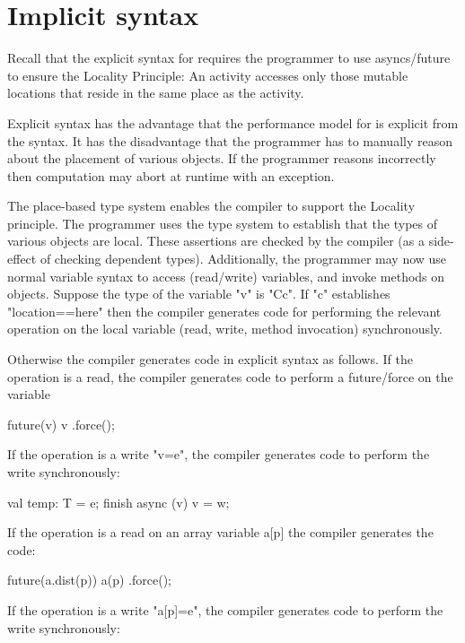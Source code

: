 \section{Implicit syntax}\label{ImplicitSyntax}

Recall that the explicit syntax for \Xten{} requires the programmer to use
asyncs/future to ensure the Locality Principle: An activity accesses
only those mutable locations that reside in the same place as the
activity. 

Explicit syntax has the advantage that the performance model for \Xten{}
is explicit from the syntax. It has the disadvantage that the
programmer has to manually reason about the placement of various
objects. If the programmer reasons incorrectly then computation may
abort at runtime with an exception.

The place-based type system enables the compiler to support the
Locality principle. The programmer uses the type system to establish
that the types of various objects are local. These assertions are
checked by the compiler (as a side-effect of checking dependent
types). Additionally, the programmer may now use normal variable
syntax to access (read/write) variables, and invoke methods on
objects. Suppose the type of the variable \xcd"v" is \xcd"C{c}".
If \xcd"c" establishes
\xcd"location==here" then the compiler generates code for
performing the relevant operation on the local variable (read,
write, method invocation) synchronously. 

Otherwise the compiler generates code in explicit syntax as
follows. If the operation is a read, the compiler generates code to
perform a future/force on the variable

\begin{xten}
future(v) { v }.force();  
\end{xten}

If the operation is a write \xcd"v=e", the compiler generates code to perform
the write synchronously:

\begin{xten}
val temp: T = e;
finish async (v) { v = w; }
\end{xten}

If the operation is a read on an array variable a[p] the compiler
generates the code:

\begin{xten}
future(a.dist(p)) { a(p) }.force();  
\end{xten}


If the operation is a write \xcd"a[p]=e", the compiler generates code to perform
the write synchronously:

